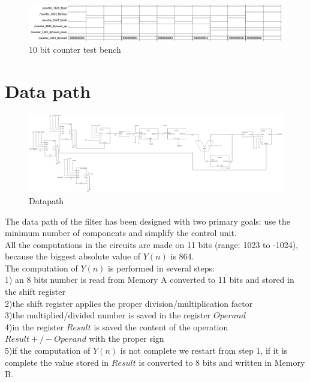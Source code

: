 \documentclass[12pt]{article}
\begin{document}
\begin{figure}[h]
	\centering
	\includegraphics[scale = 0.47]{immagini/counter_tb.png}
	\caption{10 bit counter test bench}
\end{figure}
\newpage
\section*{Data path}
\begin{figure}[h]
	\centering
	\includegraphics[scale = 0.17]{immagini/Datapath.png}
	\caption{Datapath}
\end{figure}
The data path of the filter has been designed with two primary goals: use the minimum number of components and simplify the control unit.\\
All the computations in the circuits are made on 11 bits (range: 1023 to -1024), because the biggest absolute value of $Y(n)$ is 864. \\
The computation of $Y(n)$ is performed in several steps:\\
1) an 8 bits number is read from Memory A converted to 11 bits and stored in the shift register\\
2)the shift register applies the proper division/multiplication factor\\
3)the multiplied/divided number is saved in the register $Operand$\\
4)in the register $Result$ is saved the content of the operation $Result +/- Operand$ with the proper sign\\
5)if the computation of $Y(n)$ is not complete we restart from step 1, if it is complete the value stored in $Result$ is converted to 8 bits and written in Memory B.\\
\end{document}
